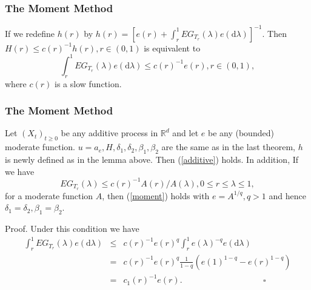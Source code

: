 \documentclass[12pt]{beamer}
\def\RR{\mathbb{R}}
\def\d{\mathrm{d}}
\begin{document}
\begin{frame}
	\frametitle{The Moment Method}
	\begin{lemma}
		If we redefine $h(r)$ by $h(r) = \left[e(r) + \int_r^1 EG_{T_r}(\lambda)e(\d \lambda)\right]^{-1}$. Then $H(r)\le c(r)^{-1}h(r),r\in(0,1)$ is equivalent to
		\begin{equation}
			\int_r^1 EG_{T_r}(\lambda)e(\d \lambda) \le c(r)^{-1}e(r), r\in(0,1),
			\label{moment}
		\end{equation}
		where $c(r)$ is a slow function.
	\end{lemma}
\end{frame}
\begin{frame}[label=momentmethod]
	\frametitle{The Moment Method}
	\small
	\begin{theorem}
		Let $(X_t)_{t\ge0}$ be any additive process in $\RR^d$ and let $e$ be any (bounded) moderate function. $u=a_e,H,\delta_1,\delta_2,\beta_1,\beta_2$ are the same as in the last theorem, $h$ is newly defined as in the lemma above. Then (\ref{additive}) holds. In addition, If we have 
		\vspace{-0.5ex}
		$$
		EG_{T_r}(\lambda)\le c(r)^{-1}A(r)/A(\lambda),0\le r \le \lambda \le 1,
		$$ 
		\vspace{-0.5ex}
		for a moderate function $A$, then (\ref{moment}) holds with $e=A^{1/q},q>1$ and hence $\delta_1=\delta_2,\beta_1=\beta_2$.
	\end{theorem}
	\pause
	Proof. Under this condition we have 
	\begin{eqnarray*}
		\int_r^1 EG_{T_r}(\lambda) e(\d\lambda) &\le& c(r)^{-1}e(r)^q\int_r^1 e(\lambda)^{-q} e(\d\lambda)\\ 
		&=&  c(r)^{-1}e(r)^q\frac1{1-q}(e(1)^{1-q}-e(r)^{1-q})\\
		&=& c_1(r)^{-1}e(r). \hspace{4cm} \square
	\end{eqnarray*}
\end{frame}
\end{document}
